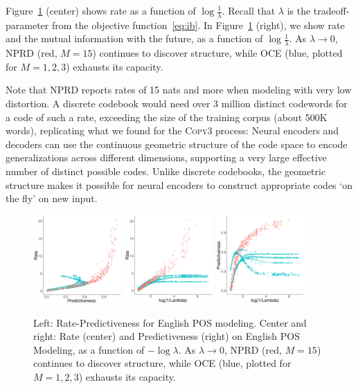 \documentclass[entropy,article,submit,moreauthors,pdftex,10pt,a4paper]{Definitions/mdpi}
\begin{document}
Figure~\ref{fig:eng-pos} (center) shows rate as a function of $\log \frac{1}{\lambda}$.
Recall that $\lambda$ is the tradeoff-parameter from the objective function~\ref{eq:ib}.
In Figure~\ref{fig:eng-pos} (right), we show rate and the mutual information with the future, as a function of $\log \frac{1}{\lambda}$.
As $\lambda \rightarrow 0$, NPRD (red, $M=15$) continues to discover structure, while OCE (blue, plotted for $M=1,2,3$) exhausts its capacity.

Note that NPRD reports rates of 15 nats and more when modeling with very low distortion.
A discrete codebook would need over 3 million distinct codewords for a code of such a rate, exceeding the size of the training corpus (about 500K words), replicating what we found for the \textsc{Copy3} process:
Neural encoders and decoders can use the continuous geometric structure of the code space to encode generalizations across different dimensions, supporting a very large effective number of distinct possible codes.
Unlike discrete codebooks, the geometric structure makes it possible for neural encoders to construct appropriate codes `on the fly' on new input.



\begin{figure}
\includegraphics[width=0.3\textwidth]{code/figures/english-info.pdf}
\includegraphics[width=0.3\textwidth]{code/figures/english-nlogbeta-mem.pdf}
\includegraphics[width=0.3\textwidth]{code/figures/english-nlogbeta-ee.pdf}
	\caption{Left: Rate-Predictiveness for English POS modeling. Center and right: Rate (center) and Predictiveness (right) on English POS Modeling, as a function of $-\log \lambda$. As $\lambda \rightarrow 0$, NPRD (red, $M=15$) continues to discover structure, while OCE (blue, plotted for $M=1,2,3$) exhausts its capacity.}\label{fig:eng-pos}
\end{figure}
\end{document}
